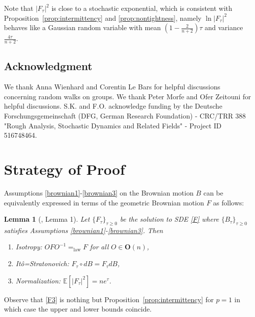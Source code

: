 \documentclass[english, letterpaper,12pt,reqno]{amsart}
\newtheorem{lemma}[theorem]{Lemma}
\theoremstyle{remark}
\theoremstyle{plain}
\newcommand{\1}{\mathbf{1}}
\def\bbE{\mathbb E}
\begin{document}
\medskip
 \noindent
Note that $|F_\tau|^2$ is close to a stochastic exponential, which is consistent with Proposition~\ref{prop:intermittency} and \ref{prop:nontightness}, namely $\ln |F_\tau|^2$ behaves like a Gaussian random variable with mean $(1-\frac{2}{n+2})\tau$ and variance $\frac{4\tau}{n+2}$. 



\subsection*{Acknowledgment}
We thank Anna Wienhard and Corentin Le Bars for helpful discussions concerning random walks on groups. We thank Peter Morfe and Ofer Zeitouni for helpful discussions. S.K. and F.O. acknowledge funding by the Deutsche Forschungsgemeinschaft (DFG, German Research Foundation) - CRC/TRR 388 "Rough Analysis, Stochastic Dynamics and Related Fields" - Project ID 516748464.

\section{Strategy of Proof}


\noindent
Assumptions \ref{brownian1}-\ref{brownian3} on the Brownian motion $B$ can be equivalently expressed in terms of the geometric Brownian motion $F$ as follows: 
\begin{lemma}[\cite{MOW25}, Lemma 1]
    Let $\{F_\tau\}_{\tau \ge 0}$ be the solution to SDE \eqref{F} where $\{B_\tau\}_{\tau \ge 0}$ satisfies Assumptions \ref{brownian1}-\ref{brownian3}. Then  
    \begin{enumerate}[label=(F\arabic*)]
    \item Isotropy: \label{F1} $OF O^{-1}=_{\text{law}}F$ for all $O\in \textbf{O}(n)$,
    \item\label{F2} Itô=Stratonovich: $F_\tau \circ dB=F_\tau dB$,
    \item \label{F3} Normalization: $\bbE[|F_\tau|^2 ]=n e^\tau $.
    \end{enumerate}
\end{lemma}
\noindent
Observe that \ref{F3} is nothing but Proposition~\ref{prop:intermittency} for $p=1$ in which case the upper and lower bounds coincide. 
\end{document}
